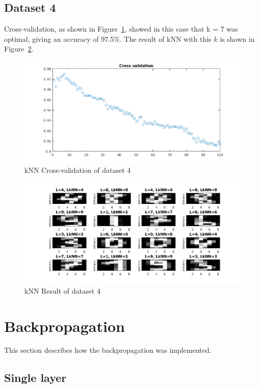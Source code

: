 \documentclass{article}
\begin{document}
\subsection{Dataset 4}

Cross-validation, as shown in Figure~\ref{fig:cv4}, showed in this
case that k = 7 was optimal, giving an accuracy of 97.5\%. 
The result of kNN with this $k$ is shown in Figure~\ref{fig:knn4}.

\begin{figure}[h!]
    \includegraphics[width=13cm]{dataset4knncv.png}
    \caption{kNN Cross-validation of dataset 4}
    \label{fig:cv4}
\end{figure}

\begin{figure}[h!]
    \includegraphics[width=13cm]{dataset4knnres.png}
    \caption{kNN Result of dataset 4}
    \label{fig:knn4}
\end{figure}

\section{Backpropagation}

This section describes how the backpropagation was implemented.

\subsection{Single layer}
\end{document}
